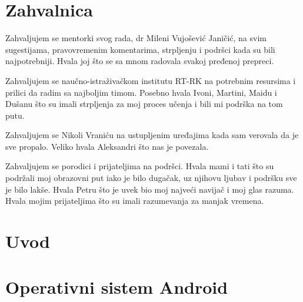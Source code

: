 \documentclass[12pt,oneside]{memoir}
\begin{document}
\frontmatter

\naslovna

\komisija
\chapter*{Zahvalnica}
Zahvaljujem se mentorki svog rada, dr Mileni Vujošević Janičić, na svim sugestijama, pravovremenim komentarima, strpljenju i podršci kada su bili najpotrebniji. Hvala joj što se sa mnom radovala svakoj pređenoj prepreci.

Zahvaljujem se naučno-istraživačkom institutu RT-RK na potrebnim resursima i prilici da radim sa najboljim timom. Posebno hvala Ivoni, Martini, Maidu i Dušanu što su imali strpljenja za moj proces učenja i bili mi podrška na tom putu.

Zahvaljujem se Nikoli Vraniću na ustupljenim uređajima kada sam verovala da je sve propalo. Veliko hvala Aleksandri što nas je povezala.

Zahvaljujem se porodici i prijateljima na podršci. Hvala mami i tati što su podržali moj obrazovni put iako je bilo dugačak, uz njihovu ljubav i podršku sve je bilo lakše.
Hvala Petru što je uvek bio moj najveći navijač i moj glas razuma. Hvala mojim prijateljima što su imali razumevanja za manjak vremena.


\apstrakt

\tableofcontents*

\mainmatter

\chapter{Uvod}



\chapter{Operativni sistem Android}
\label{sec:android}

\end{document}
